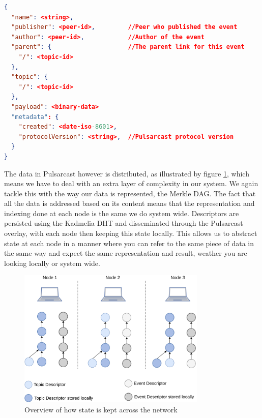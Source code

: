 \noindent\begin{minipage}{\textwidth}
\vspace{8pt}
\begin{lstlisting}[language=JSON,caption={Event descriptor schema in a JSON based format},label={event-descriptor}]
{
  "name": <string>,
  "publisher": <peer-id>,         //Peer who published the event
  "author": <peer-id>,            //Author of the event
  "parent": {                     //The parent link for this event
    "/": <topic-id>
  },
  "topic": {
    "/": <topic-id>
  },
  "payload": <binary-data>
  "metadata": {
    "created": <date-iso-8601>,
    "protocolVersion": <string>,  //Pulsarcast protocol version
  }
}
\end{lstlisting}
\vspace{8pt}
\end{minipage}

The data in Pulsarcast however is distributed, as illustrated by figure \ref{fig:pulsarcast-local-vs-distributed-state}, which means we have to deal with
an extra layer of complexity in our system. We again tackle this with the way
our data is represented, the Merkle DAG. The fact that all the data is
addressed based on its content means that the representation and indexing done
at each node is the same we do system wide. Descriptors are persisted using the
Kadmelia DHT and disseminated through the Pulsarcast overlay, with each node
then keeping this state locally. This allows us to abstract state at each node
in a manner where you can refer to the same piece of data in the same way and
expect the same representation and result, weather you are looking locally or
system wide.

\begin{figure}[hb!]
  \centering
  \includegraphics[width=0.8\textwidth]{img/pulsarcast-local-vs-distributed-state.png}
  \caption{Overview of how state is kept across the network}
  \label{fig:pulsarcast-local-vs-distributed-state}
\end{figure}

